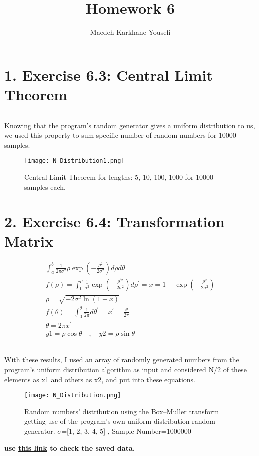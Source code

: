 \documentclass[12pt]{article}
\title{\textbf{Homework 6}}
\author{Maedeh Karkhane Yousefi}
\begin{document}
\maketitle
\part*{1. Exercise 6.3: Central Limit Theorem}
\paragraph*{} Knowing that the program's random generator gives a uniform distribution to us, we used this property to sum specific number of random numbers for 10000 samples.
\begin{figure}[H]
	\centering
	\texttt{[image: N\_Distribution1.png]}
	\label{fig:mesh1}
	\caption{Central Limit Theorem for lengths: 5, 10, 100, 1000 for 10000 samples each. }
\end{figure}
\part*{2. Exercise 6.4: Transformation Matrix}
\begin{gather*}
\int_{a}^{b} \frac{1}{2 \pi \sigma^{2}} \rho \exp \left(-\frac{\rho^{2}}{2 \sigma^{2}}\right) d \rho d \theta\\
f(\rho)=\int_{0}^{\rho} \frac{1}{\sigma^{2}} \exp \left(-\frac{\rho^{\prime 2}}{2 \sigma^{2}}\right) d \rho^{\prime}=x=1-\exp \left(-\frac{\rho^{2}}{2 \sigma^{2}}\right)\\
\rho=\sqrt{-2 \sigma^{2} \ln (1-x)}\\
f(\theta)=\int_{0}^{\theta} \frac{1}{2 \pi} d \theta^{\prime}=x^{\prime}=\frac{\theta}{2 \pi}\\
\theta=2 \pi x^{\prime}\\
y 1=\rho \cos \theta \quad, \quad y 2=\rho \sin \theta
\end{gather*} 
\paragraph*{} With these results, I used an array of randomly generated numbers from the program's uniform distribution algorithm as input and considered N/2 of these elements as x1 and others as x2, and put into these equations. 
\begin{figure}[H]
	\centering
	\texttt{[image: N\_Distribution.png]}
	\label{fig:mesh2}
	\caption{Random numbers' distribution using the Box–Muller transform getting use of the program's own uniform distribution random generator. $\sigma$=[1, 2, 3, 4, 5] , Sample Number=1000000}
\end{figure}
    \textbf{use \href{https://github.com/narges8k/computational_physics/tree/main/chapter6}{this link} to check the saved data. }
\end{document}
